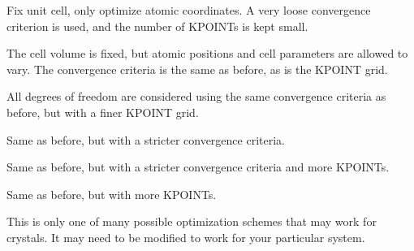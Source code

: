 \begin{DoxyEnumerate}
\item Fix unit cell, only optimize atomic coordinates. A very loose convergence criterion is used, and the number of K\-P\-O\-I\-N\-Ts is kept small.
\item The cell volume is fixed, but atomic positions and cell parameters are allowed to vary. The convergence criteria is the same as before, as is the K\-P\-O\-I\-N\-T grid.
\item All degrees of freedom are considered using the same convergence criteria as before, but with a finer K\-P\-O\-I\-N\-T grid.
\item Same as before, but with a stricter convergence criteria.
\item Same as before, but with a stricter convergence criteria and more K\-P\-O\-I\-N\-Ts.
\item Same as before, but with more K\-P\-O\-I\-N\-Ts.
\end{DoxyEnumerate}

This is only one of many possible optimization schemes that may work for crystals. It may need to be modified to work for your particular system. 